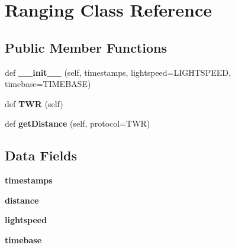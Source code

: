 \hypertarget{classranging_1_1_ranging}{}\section{Ranging Class Reference}
\label{classranging_1_1_ranging}
\subsection*{Public Member Functions}
\begin{DoxyCompactItemize}
\item 
\mbox{\label{classranging_1_1_ranging_a29a2ca6999cd0cbb296d73f0f1132573}} 
def {\bfseries \+\_\+\+\_\+init\+\_\+\+\_\+} (self, timestamps, lightspeed=L\+I\+G\+H\+T\+S\+P\+E\+ED, timebase=T\+I\+M\+E\+B\+A\+SE)
\item 
\mbox{\label{classranging_1_1_ranging_a7d57354a4f9f8d4e428a2539e176493a}} 
def {\bfseries T\+WR} (self)
\item 
\mbox{\label{classranging_1_1_ranging_a8f189dac28c87f6cff91c4d58b76fbe2}} 
def {\bfseries get\+Distance} (self, protocol=\textquotesingle{}T\+WR\textquotesingle{})
\end{DoxyCompactItemize}
\subsection*{Data Fields}
\begin{DoxyCompactItemize}
\item 
\mbox{\label{classranging_1_1_ranging_ada03328a9187736162c7277d89ef159e}} 
{\bfseries timestamps}
\item 
\mbox{\label{classranging_1_1_ranging_a3139244bfb778557108cda2114f91f3f}} 
{\bfseries distance}
\item 
\mbox{\label{classranging_1_1_ranging_a15cd30083f8aedfcb4d62a56c87e294a}} 
{\bfseries lightspeed}
\item 
\mbox{\label{classranging_1_1_ranging_a3037a14116abb6bcdbf6d94ed5461809}} 
{\bfseries timebase}
\end{DoxyCompactItemize}


